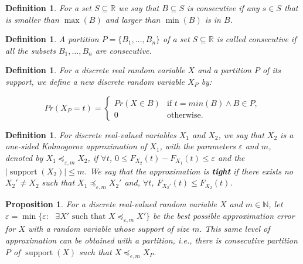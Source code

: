\documentclass[review]{elsarticle}
\newtheorem{definition}[lemma]{Definition}
\newtheorem{proposition}[lemma]{Proposition}
\DeclareMathOperator{\supp}{support}
\DeclareMathOperator{\support}{support}
\begin{document}
\begin{definition}\label{consecutive} For a set $S \subseteq \mathbb{R}$ we say that
$B \subseteq S$ is \emph{consecutive} if any $s\in S$ that is smaller than $\max(B)$ and larger than $\min(B)$ is in $B$.
\end{definition}

\begin{definition}\label{part_consecutive} A partition $P=\{B_1,\dots,B_n\}$ of a set $S \subseteq \mathbb{R}$ is called 
\emph{consecutive} if all the subsets $B_1 ,\dots,B_n$ are consecutive.
\end{definition}


\begin{definition}\label{partition}
	For a discrete real random variable $X$ and a partition $P$ of its support, we define a new discrete random variable $X_P$ by:
	
	$$Pr(X_P = t) = \begin{cases} 
	Pr(X\in B) &  \text{if } t = min(B) \wedge  B \in P, \\
	0      & \text{otherwise.}
	\end{cases}$$
\end{definition}


\begin{definition}
	For discrete real-valued variables $X_1$ and $X_2$, we say that $X_2$ is a one-sided Kolmogorov approximation of $X_1$, with the parameters $\varepsilon$ and $m$, denoted by 
	$X_1 \preceq_{\varepsilon,m} X_2$, if $\forall t$, $0 \leq   F_{X_2}(t)-F_{X_1}(t) \leq \varepsilon$ and the $\mid\support(X_2)\mid \leq m$. We say that the approximation is \textbf{tight} if there exists no  $X_2' \neq X_2$ such that $X_1 \preceq_{\varepsilon,m} X_2'$ and, $\forall t$, $F_{X_2'}(t) \leq F_{X_2}(t)$. 
\end{definition}

\begin{proposition}
	For a discrete real-valued random variable $X$ and $m \in \mathbb{N}$, 
	let $\varepsilon = \min\{\varepsilon \colon \text{  $\exists X'$ such that $X \preceq_{\varepsilon,m} X'$}\}$ be the best possible approximation error for $X$ with a random variable whose support of size $m$. This same level of approximation can be obtained with a partition, i.e., there is consecutive partition $P$ of $\supp(X)$ such that $X \preceq_{\varepsilon,m} X_P$.
	
\end{proposition}
\end{document}
